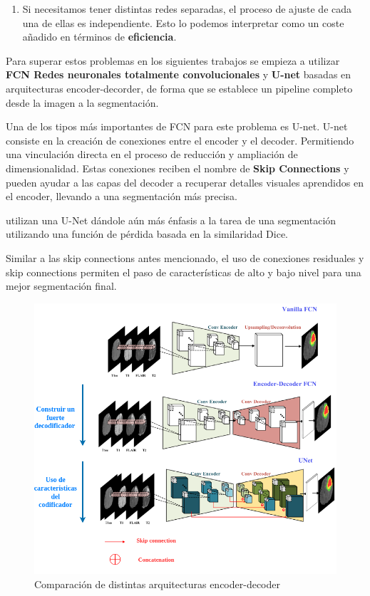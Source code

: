 \begin{enumerate}
\begin{enumerate}
					\item Si necesitamos tener distintas redes separadas, el proceso de ajuste de cada una de ellas es independiente. Esto lo podemos interpretar como un coste añadido en términos de \textbf{eficiencia}.
					
				\end{enumerate}
				
				Para superar estos problemas en los siguientes trabajos se empieza a utilizar \textbf{FCN Redes neuronales totalmente convolucionales} y \textbf{U-net} basadas en arquitecturas encoder-decorder, de forma que se establece un pipeline completo desde la imagen a la segmentación.
				
				Una de los tipos más importantes de FCN para este problema es U-net. U-net consiste en la creación de conexiones entre el encoder y el decoder. Permitiendo una vinculación directa en el proceso de reducción y ampliación de dimensionalidad. Estas conexiones reciben el nombre de \textbf{Skip Connections} y pueden ayudar a las capas del decoder a recuperar detalles visuales aprendidos en el encoder, llevando a una segmentación más precisa.
				
				\cite{isensee2018brain} utilizan una U-Net dándole aún más énfasis a la tarea de una segmentación utilizando una función de pérdida basada en la similaridad Dice.
				
				Similar a las skip connections antes mencionado, el uso de conexiones residuales  y skip connections permiten el paso de características de alto y bajo nivel para una mejor segmentación final.
				
				\begin{figure}[!h]
					\centering
					\includegraphics[width=0.85\linewidth]{imagenes/encoder-decoderIMG.drawio.png}
					\caption{Comparación de distintas arquitecturas encoder-decoder}
				\end{figure}
				
			\end{enumerate}
			
